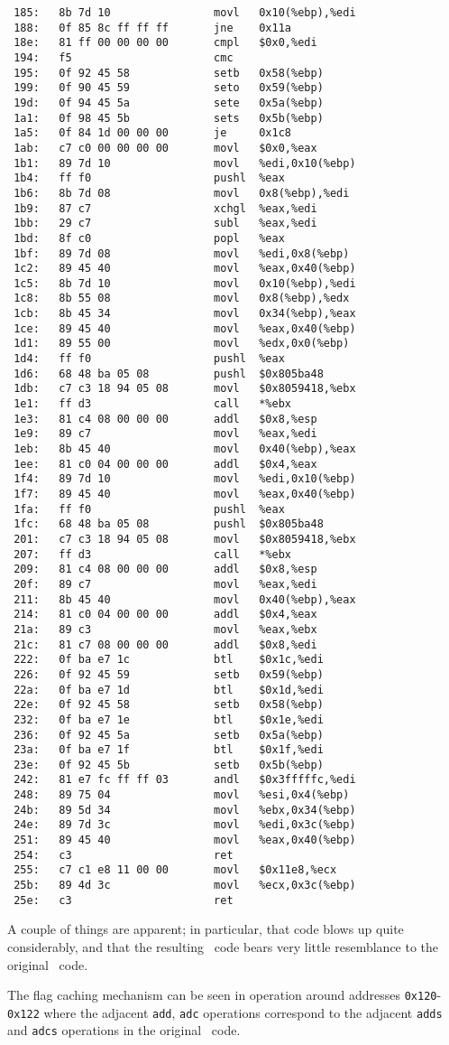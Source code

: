 \begin{verbatim}
 185:	8b 7d 10             	movl   0x10(%ebp),%edi
 188:	0f 85 8c ff ff ff    	jne    0x11a
 18e:	81 ff 00 00 00 00    	cmpl   $0x0,%edi
 194:	f5                   	cmc    
 195:	0f 92 45 58          	setb   0x58(%ebp)
 199:	0f 90 45 59          	seto   0x59(%ebp)
 19d:	0f 94 45 5a          	sete   0x5a(%ebp)
 1a1:	0f 98 45 5b          	sets   0x5b(%ebp)
 1a5:	0f 84 1d 00 00 00    	je     0x1c8
 1ab:	c7 c0 00 00 00 00    	movl   $0x0,%eax
 1b1:	89 7d 10             	movl   %edi,0x10(%ebp)
 1b4:	ff f0                	pushl  %eax
 1b6:	8b 7d 08             	movl   0x8(%ebp),%edi
 1b9:	87 c7                	xchgl  %eax,%edi
 1bb:	29 c7                	subl   %eax,%edi
 1bd:	8f c0                	popl   %eax
 1bf:	89 7d 08             	movl   %edi,0x8(%ebp)
 1c2:	89 45 40             	movl   %eax,0x40(%ebp)
 1c5:	8b 7d 10             	movl   0x10(%ebp),%edi
 1c8:	8b 55 08             	movl   0x8(%ebp),%edx
 1cb:	8b 45 34             	movl   0x34(%ebp),%eax
 1ce:	89 45 40             	movl   %eax,0x40(%ebp)
 1d1:	89 55 00             	movl   %edx,0x0(%ebp)
 1d4:	ff f0                	pushl  %eax
 1d6:	68 48 ba 05 08       	pushl  $0x805ba48
 1db:	c7 c3 18 94 05 08    	movl   $0x8059418,%ebx
 1e1:	ff d3                	call   *%ebx
 1e3:	81 c4 08 00 00 00    	addl   $0x8,%esp
 1e9:	89 c7                	movl   %eax,%edi
 1eb:	8b 45 40             	movl   0x40(%ebp),%eax
 1ee:	81 c0 04 00 00 00    	addl   $0x4,%eax
 1f4:	89 7d 10             	movl   %edi,0x10(%ebp)
 1f7:	89 45 40             	movl   %eax,0x40(%ebp)
 1fa:	ff f0                	pushl  %eax
 1fc:	68 48 ba 05 08       	pushl  $0x805ba48
 201:	c7 c3 18 94 05 08    	movl   $0x8059418,%ebx
 207:	ff d3                	call   *%ebx
 209:	81 c4 08 00 00 00    	addl   $0x8,%esp
 20f:	89 c7                	movl   %eax,%edi
 211:	8b 45 40             	movl   0x40(%ebp),%eax
 214:	81 c0 04 00 00 00    	addl   $0x4,%eax
 21a:	89 c3                	movl   %eax,%ebx
 21c:	81 c7 08 00 00 00    	addl   $0x8,%edi
 222:	0f ba e7 1c          	btl    $0x1c,%edi
 226:	0f 92 45 59          	setb   0x59(%ebp)
 22a:	0f ba e7 1d          	btl    $0x1d,%edi
 22e:	0f 92 45 58          	setb   0x58(%ebp)
 232:	0f ba e7 1e          	btl    $0x1e,%edi
 236:	0f 92 45 5a          	setb   0x5a(%ebp)
 23a:	0f ba e7 1f          	btl    $0x1f,%edi
 23e:	0f 92 45 5b          	setb   0x5b(%ebp)
 242:	81 e7 fc ff ff 03    	andl   $0x3fffffc,%edi
 248:	89 75 04             	movl   %esi,0x4(%ebp)
 24b:	89 5d 34             	movl   %ebx,0x34(%ebp)
 24e:	89 7d 3c             	movl   %edi,0x3c(%ebp)
 251:	89 45 40             	movl   %eax,0x40(%ebp)
 254:	c3                   	ret    
 255:	c7 c1 e8 11 00 00    	movl   $0x11e8,%ecx
 25b:	89 4d 3c             	movl   %ecx,0x3c(%ebp)
 25e:	c3                   	ret    
\end{verbatim}

A couple of things are apparent; in particular, that code blows up quite considerably, and that the resulting \ia\ code bears very little resemblance to the original \arm\ code.

The flag caching mechanism can be seen in operation around addresses {\tt 0x120}-{\tt 0x122} where the adjacent {\tt add}, {\tt adc} operations correspond to the adjacent {\tt adds} and {\tt adcs} operations in the original \arm\ code.
